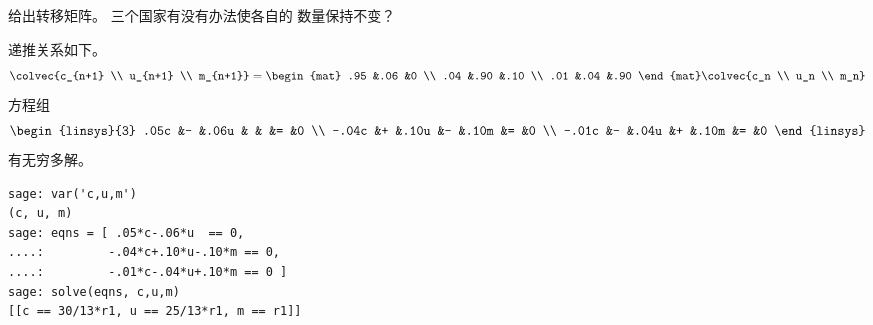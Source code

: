 \begin{exercises}
\begin{exparts}
      \partsitem 给出转移矩阵。
      \partsitem 三个国家有没有办法使各自的
         数量保持不变？
    \end{exparts}
    \begin{answer}
      \begin{exparts}
        \partsitem 递推关系如下。
          \begin{equation*}
            \colvec{c_{n+1} \\ u_{n+1} \\ m_{n+1}}
            =
            \begin{mat}
              .95  &.06  &0  \\
              .04  &.90  &.10  \\
              .01  &.04  &.90
            \end{mat}
            \colvec{c_n \\ u_n  \\ m_n}
          \end{equation*}
        \partsitem 方程组
          \begin{equation*}
            \begin{linsys}{3}
              .05c &- &.06u &  &     &= &0  \\
             -.04c &+ &.10u &- &.10m &= &0  \\
             -.01c &- &.04u &+ &.10m &= &0
            \end{linsys}
          \end{equation*}
          有无穷多解。
\begin{lstlisting}
sage: var('c,u,m')
(c, u, m)
sage: eqns = [ .05*c-.06*u  == 0,
....:         -.04*c+.10*u-.10*m == 0,
....:         -.01*c-.04*u+.10*m == 0 ]
sage: solve(eqns, c,u,m)
[[c == 30/13*r1, u == 25/13*r1, m == r1]]
\end{lstlisting}
      \end{exparts}
    \end{answer}
\end{exercises}
\endinput






